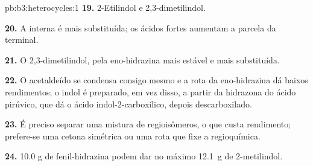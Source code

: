 \begin{solution}{pb:b3:heterocycles:1}
\textbf{19.} 2-Etilindol e 2,3-dimetilindol.

\textbf{20.} A interna é mais substituída; os ácidos fortes aumentam a parcela da
terminal.

\textbf{21.} O 2,3-dimetilindol, pela eno-hidrazina mais estável e mais
substituída.

\textbf{22.} O acetaldeído se condensa consigo mesmo e a rota da eno-hidrazina dá baixos
rendimentos; o indol é preparado, em vez disso, a partir da hidrazona do ácido pirúvico, que dá o
ácido indol-2-carboxílico, depois descarboxilado.

\textbf{23.} É preciso separar uma mistura de regioisômeros, o que custa rendimento; prefere-se uma
cetona simétrica ou uma rota que fixe a regioquímica.

\textbf{24.} 10.0 g de fenil-hidrazina podem dar no máximo \qty{12.1}{g} de 2-metilindol.
\end{solution}
